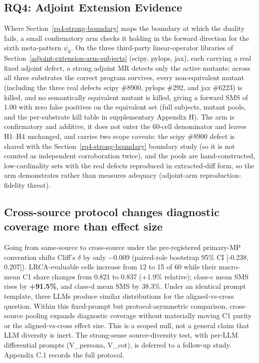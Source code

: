\documentclass[review,12pt,authoryear]{elsarticle}
\begin{document}
\subsection{RQ4: Adjoint Extension Evidence}\label{rq4-adjoint-extension-arm}

Where Section~\ref{rq4-strong-boundary} maps the boundary at which the duality fails, a small
confirmatory arm checks it holding in the forward direction for the sixth
meta-pattern $\psi_6$. On the three third-party linear-operator libraries
of Section~\ref{adjoint-extension-arm-subjects} (scipy, pylops, jax), each carrying a real fixed adjoint defect, a
strong adjoint MR detects only the active mutants: across all three
substrates the correct program survives, every non-equivalent mutant
(including the three real defects scipy \#8900, pylops \#292, and jax
\#6223) is killed, and no semantically equivalent mutant is killed, giving
a forward SMS of 1.00 with zero false positives on the equivalent set
(full subjects, mutant pools, and the per-substrate kill table in
supplementary Appendix H). The arm is confirmatory and additive, it
does not enter the 60-cell denominator and leaves H1--H4 unchanged, and
carries two scope caveats: the scipy \#8900 defect is shared with the Section~\ref{rq4-strong-boundary}
boundary study (so it is not counted as independent corroboration twice),
and the pools are hand-constructed, low-cardinality sets with the real
defects reproduced in extracted-diff form, so the arm demonstrates rather
than measures adequacy (adjoint-arm reproduction-fidelity threat).


\label{discussion}

\subsection{Cross-source protocol changes diagnostic coverage more than effect size}\label{cross-source-contributes-mutant-quality-not-effect-size}

Going from same-source to cross-source under the pre-registered
primary-MP convention shifts Cliff's $\delta$ by only −0.009 (paired-role
bootstrap 95\% CI {[}-0.238, 0.207{]}). LRCA-evaluable cells increase
from 12 to 15 of 60 while their macro-mean C1 share changes from 0.821
to 0.837 (+1.9\% relative); class-c mean SMS rises by \textbf{+91.5\%}, and
class-d mean SMS by 38.3\%. Under an identical prompt template, three
LLMs produce similar distributions for the aligned-vs-cross question.
Within this fixed-prompt but protocol-asymmetric comparison, cross-source
pooling expands diagnostic coverage without materially moving C1 purity
or the aligned-vs-cross effect size. This is a scoped null,
not a general claim that LLM diversity is inert. The strong-sense
source-diversity test, with per-LLM differential prompts (V\_persona,
V\_cot), is deferred to a follow-up study. Appendix C.1 records the full
protocol.
\end{document}
